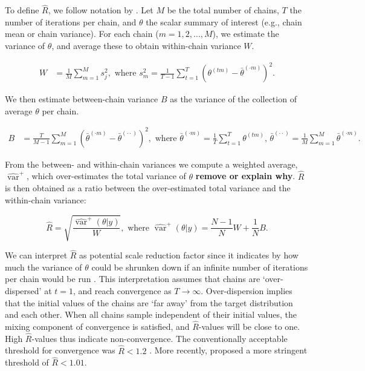 \documentclass[Royal,times,sageh]{sagej}
\begin{document}
To define \(\widehat{R}\), we follow notation by \citep[p.~5]{veht19}.
Let \(M\) be the total number of chains, \(T\) the number of iterations
per chain, and \(\theta\) the scalar summary of interest (e.g., chain
mean or chain variance). For each chain (\(m = 1, 2, \dots, M\)), we
estimate the variance of \(\theta\), and average these to obtain
within-chain variance \(W\).

\begin{align*}
W&=\frac{1}{M} \sum_{m=1}^{M} s_{j}^{2},  \text { where } s_{m}^{2}=\frac{1}{T-1} \sum_{t=1}^{T}\left(\theta^{(t m)}-\bar{\theta}^{(\cdot m)}\right)^{2}. 
\end{align*}

We then estimate between-chain variance \(B\) as the variance of the
collection of average \(\theta\) per chain.

\begin{align*}
B&=\frac{T}{M-1} \sum_{m=1}^{M}\left(\bar{\theta}^{(\cdot m)}-\bar{\theta}^{(\cdot \cdot)}\right)^{2}, \text { where } \bar{\theta}^{(\cdot m)}=\frac{1}{T} \sum_{t=1}^{T} \theta^{(t m)} \text{, } \bar{\theta}^{(\cdot \cdot)}=\frac{1}{M} \sum_{m=1}^{M} \bar{\theta}^{(\cdot m)}. 
\end{align*}

From the between- and within-chain variances we compute a weighted
average, \(\widehat{\operatorname{var}}^{+}\), which over-estimates the
total variance of \(\theta\) \textbf{remove or explain why}.
\(\widehat{R}\) is then obtained as a ratio between the over-estimated
total variance and the within-chain variance:

\begin{equation*}
\widehat{R}=\sqrt{\frac{\widehat{\operatorname{var}}^{+}(\theta | y)}{W}},
\text{ where } \widehat{\operatorname{var}}^{+}(\theta | y)=\frac{N-1}{N} W+\frac{1}{N} B.
\end{equation*}

We can interpret \(\widehat{R}\) as potential scale reduction factor
since it indicates by how much the variance of \(\theta\) could be
shrunken down if an infinite number of iterations per chain would be run
\citep{gelm92}. This interpretation assumes that chains are
`over-dispersed' at \(t=1\), and reach convergence as \(T \to \infty\).
Over-dispersion implies that the initial values of the chains are `far
away' from the target distribution and each other. When all chains
sample independent of their initial values, the mixing component of
convergence is satisfied, and \(\widehat{R}\)-values will be close to
one. High \(\widehat{R}\)-values thus indicate non-convergence. The
conventionally acceptable threshold for convergence was
\(\widehat{R} < 1.2\) \citep{gelm92}. More recently, \citet{veht19}
proposed a more stringent threshold of \(\widehat{R} < 1.01\).
\end{document}
